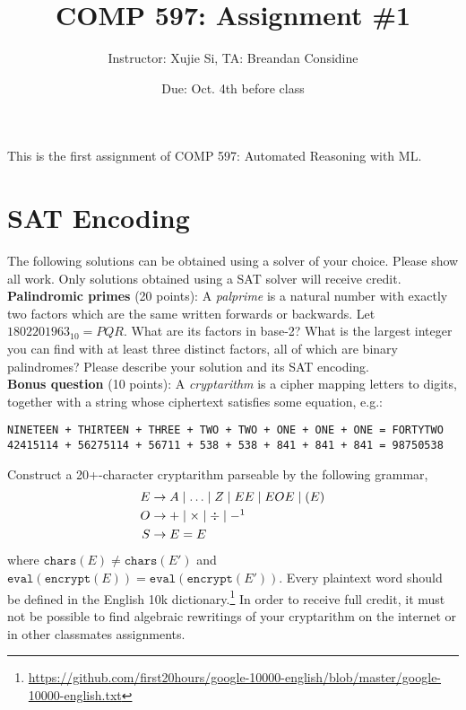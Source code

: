 \documentclass[11pt]{article}
\author{Instructor: Xujie Si, TA: Breandan Considine}
\date{Due: Oct. 4th before class}
\title{COMP 597: Assignment \#1}
\begin{document}
    \maketitle
    \noindent This is the first assignment of COMP 597: Automated Reasoning with ML.


    \section{SAT Encoding}

    The following solutions can be obtained using a solver of your choice. Please show all work. Only solutions obtained using a SAT solver will receive credit.\\

    \noindent \textbf{Palindromic primes} (20 points): A \textit{palprime} is a natural number with exactly two factors which are the same written forwards or backwards. Let $1802201963_{10} = PQR$. What are its factors in base-2? What is the largest integer you can find with at least three distinct factors, all of which are binary palindromes? Please describe your solution and its SAT encoding.\\

    \noindent \textbf{Bonus question} (10 points): A \textit{cryptarithm} is a cipher mapping letters to digits, together with a string whose ciphertext satisfies some equation, e.g.:

    \begin{lstlisting}[basicstyle=\scriptsize\ttfamily]
NINETEEN + THIRTEEN + THREE + TWO + TWO + ONE + ONE + ONE = FORTYTWO
42415114 + 56275114 + 56711 + 538 + 538 + 841 + 841 + 841 = 98750538
    \end{lstlisting}

    \noindent Construct a 20+-character cryptarithm parseable by the following grammar,
    \begin{align*}
E &\rightarrow A \mid \ldots \mid Z \mid EE \mid E O E \mid ( E )\\
O &\rightarrow + \mid \times \mid \div \mid -\footnotemark\\
S &\rightarrow E = E
    \end{align*}
    \noindent where $\texttt{chars}(E) \neq \texttt{chars}(E')$ and $\texttt{eval}(\texttt{encrypt}(E)) = \texttt{eval}(\texttt{encrypt}(E'))$. Every plaintext word should be defined in the English 10k dictionary.\footnote{\tiny\url{https://github.com/first20hours/google-10000-english/blob/master/google-10000-english.txt}} In order to receive full credit, it must not be possible to find algebraic rewritings of your cryptarithm on the internet or in other classmates assignments.\\
\end{document}
